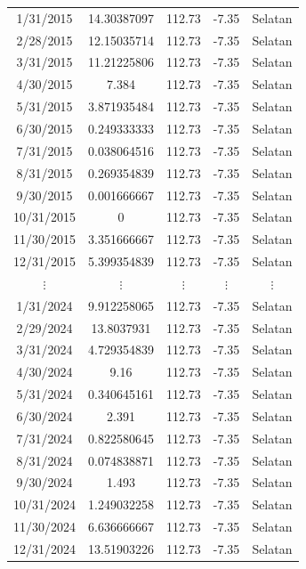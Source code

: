 \begin{longtable}{|c|c|c|c|c|}
    1/31/2015  & 14.30387097 & 112.73 & -7.35 & Selatan \\
    2/28/2015  & 12.15035714 & 112.73 & -7.35 & Selatan \\
    3/31/2015  & 11.21225806 & 112.73 & -7.35 & Selatan \\
    4/30/2015  & 7.384        & 112.73 & -7.35 & Selatan \\
    5/31/2015  & 3.871935484  & 112.73 & -7.35 & Selatan \\
    6/30/2015  & 0.249333333  & 112.73 & -7.35 & Selatan \\
    7/31/2015  & 0.038064516  & 112.73 & -7.35 & Selatan \\
    8/31/2015  & 0.269354839  & 112.73 & -7.35 & Selatan \\
    9/30/2015  & 0.001666667  & 112.73 & -7.35 & Selatan \\
    10/31/2015 & 0            & 112.73 & -7.35 & Selatan \\
    11/30/2015 & 3.351666667  & 112.73 & -7.35 & Selatan \\
    12/31/2015 & 5.399354839  & 112.73 & -7.35 & Selatan \\
    \multicolumn{1}{|c|}{$\vdots$} &
    \multicolumn{1}{c|}{$\vdots$} &
    \multicolumn{1}{c|}{$\vdots$} &
    \multicolumn{1}{c|}{$\vdots$} &
    \multicolumn{1}{c|}{$\vdots$} \\
    1/31/2024  & 9.912258065  & 112.73 & -7.35 & Selatan \\
    2/29/2024  & 13.8037931   & 112.73 & -7.35 & Selatan \\
    3/31/2024  & 4.729354839  & 112.73 & -7.35 & Selatan \\
    4/30/2024  & 9.16         & 112.73 & -7.35 & Selatan \\
    5/31/2024  & 0.340645161  & 112.73 & -7.35 & Selatan \\
    6/30/2024  & 2.391        & 112.73 & -7.35 & Selatan \\
    7/31/2024  & 0.822580645  & 112.73 & -7.35 & Selatan \\
    8/31/2024  & 0.074838871  & 112.73 & -7.35 & Selatan \\
    9/30/2024  & 1.493        & 112.73 & -7.35 & Selatan \\
    10/31/2024 & 1.249032258  & 112.73 & -7.35 & Selatan \\
    11/30/2024 & 6.636666667  & 112.73 & -7.35 & Selatan \\
    12/31/2024 & 13.51903226  & 112.73 & -7.35 & Selatan \\
    \hline


\end{longtable}
